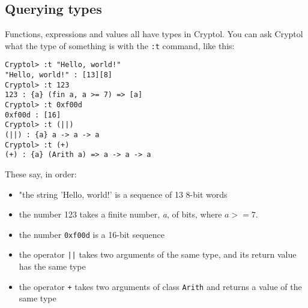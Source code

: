 \documentclass[9pt,letter]{article}
\begin{document}
\subsection{Querying types}
Functions, expressions and values all have types in Cryptol. You can ask Cryptol what the type of something is with the \verb|:t| command, like this:
\begin{verbatim}
Cryptol> :t "Hello, world!"
"Hello, world!" : [13][8]
Cryptol> :t 123
123 : {a} (fin a, a >= 7) => [a]
Cryptol> :t 0xf00d
0xf00d : [16]
Cryptol> :t (||)
(||) : {a} a -> a -> a
Cryptol> :t (+)
(+) : {a} (Arith a) => a -> a -> a
\end{verbatim}
These say, in order:
\begin{itemize}
\item{"the string 'Hello, world!' is a sequence of 13 8-bit words}
\item{the number 123 takes a finite number, {\it a}, of bits, where $a >= 7$.}
\item{the number \verb|0xf00d| is a 16-bit sequence}
\item{the operator \verb+||+ takes two arguments of the same type, and its return value has the same type}
\item{the operator \verb|+| takes two arguments of class \verb|Arith| and returns a value of the same type}
\end{itemize}
\end{document}
